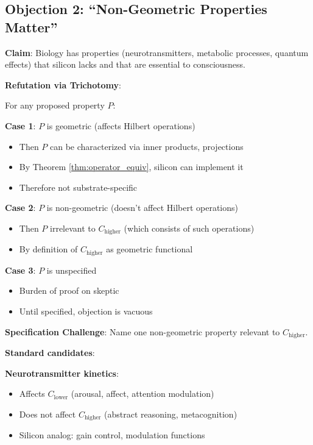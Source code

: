 \documentclass[11pt]{article}
\begin{document}
\subsection{Objection 2: ``Non-Geometric Properties Matter''}

\textbf{Claim}: Biology has properties (neurotransmitters, metabolic processes, quantum effects) that silicon lacks and that are essential to consciousness.

\textbf{Refutation via Trichotomy}:

For any proposed property $P$:

\textbf{Case 1}: $P$ is geometric (affects Hilbert operations)
\begin{itemize}
\item Then $P$ can be characterized via inner products, projections
\item By Theorem \ref{thm:operator_equiv}, silicon can implement it
\item Therefore not substrate-specific
\end{itemize}

\textbf{Case 2}: $P$ is non-geometric (doesn't affect Hilbert operations)
\begin{itemize}
\item Then $P$ irrelevant to $C_{\text{higher}}$ (which consists of such operations)
\item By definition of $C_{\text{higher}}$ as geometric functional
\end{itemize}

\textbf{Case 3}: $P$ is unspecified
\begin{itemize}
\item Burden of proof on skeptic
\item Until specified, objection is vacuous
\end{itemize}

\textbf{Specification Challenge}: Name one non-geometric property relevant to $C_{\text{higher}}$.

\textbf{Standard candidates}:

\textbf{Neurotransmitter kinetics}:
\begin{itemize}
\item Affects $C_{\text{lower}}$ (arousal, affect, attention modulation)
\item Does not affect $C_{\text{higher}}$ (abstract reasoning, metacognition)
\item Silicon analog: gain control, modulation functions
\end{itemize}
\end{document}
